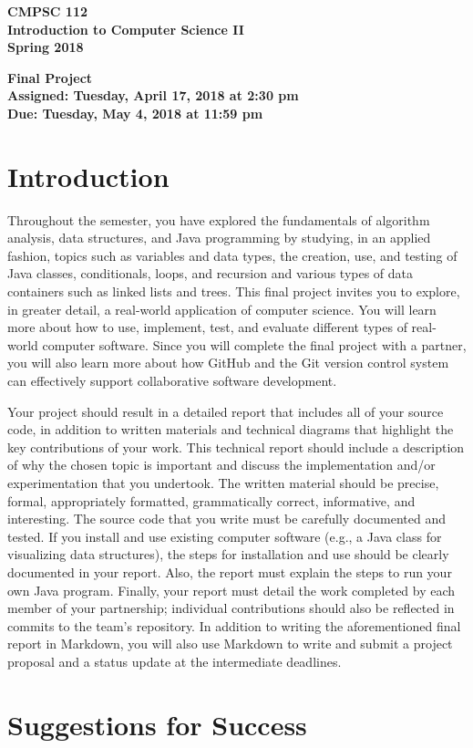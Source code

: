 \documentclass[11pt]{article}
\newcommand{\assignmentduedate}{May 4}
\newcommand{\assignmentassignedate}{April 17}
\newcommand{\labyear}{2018}
\newcommand{\labday}{Tuesday}
\newcommand{\labtime}{2:30 pm}
\newcommand{\labduetime}{11:59 pm}
\newcommand{\assigneddate}{Assigned: \labday, \assignmentassignedate, \labyear{} at \labtime{}}
\newcommand{\duedate}{Due: \labday, \assignmentduedate, \labyear{} at \labduetime{}}
\newcommand{\labtitle}[1]
{
  \begin{center}
    \begin{center}
      \bf
      CMPSC 112\\Introduction to Computer Science II\\
      Spring 2018\\
      \medskip
    \end{center}
    \bf
    #1
  \end{center}
}
\begin{document}
\thispagestyle{empty}

\labtitle{Final Project \\ \assigneddate{} \\ \duedate{}}

\section*{Introduction}

Throughout the semester, you have explored the fundamentals of algorithm
analysis, data structures, and Java programming by studying, in an applied
fashion, topics such as variables and data types, the creation, use, and testing
of Java classes, conditionals, loops, and recursion and various types of data
containers such as linked lists and trees. This final project invites you to
explore, in greater detail, a real-world application of computer science. You
will learn more about how to use, implement, test, and evaluate different types
of real-world computer software. Since you will complete the final project with
a partner, you will also learn more about how GitHub and the Git version control
system can effectively support collaborative software development.

Your project should result in a detailed report that includes all of your source
code, in addition to written materials and technical diagrams that highlight the
key contributions of your work. This technical report should include a
description of why the chosen topic is important and discuss the implementation
and/or experimentation that you undertook. The written material should be
precise, formal, appropriately formatted, grammatically correct, informative,
and interesting. The source code that you write must be carefully documented and
tested. If you install and use existing computer software (e.g., a Java class
for visualizing data structures), the steps for installation and use should be
clearly documented in your report. Also, the report must explain the steps to
run your own Java program. Finally, your report must detail the work completed
by each member of your partnership; individual contributions should also be
reflected in commits to the team's repository. In addition to writing the
aforementioned final report in Markdown, you will also use Markdown to write and
submit a project proposal and a status update at the intermediate deadlines.

\section*{Suggestions for Success}
\end{document}
